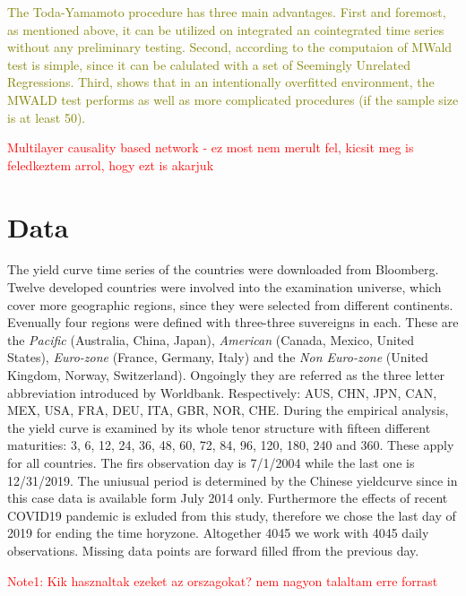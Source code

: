 \documentclass[12pt,bibliography=totoc]{article}
\begin{document}
\textcolor{olive}{The Toda-Yamamoto procedure  has  three main advantages.  First and foremost, as mentioned above, it can be utilized on integrated an cointegrated time series without any preliminary testing. Second, according to \cite{rambaldi1996testing} the computaion of MWald test is simple, since it can be calulated with a set of Seemingly  Unrelated  Regressions. Third, \cite{zapata1997monte} shows that in an intentionally overfitted environment, the MWALD test performs as well as more complicated procedures (if the sample size is at least 50).}


\textcolor{red}{Multilayer causality based network - ez most nem merult fel, kicsit meg is feledkeztem arrol, hogy ezt is akarjuk}


\newpage 



\section{Data}

The yield curve time series of the countries were downloaded from Bloomberg. Twelve developed countries were involved into the examination universe, which cover more geographic regions, since they were selected from different continents. Evenually four regions were defined with three-three suvereigns in each. These are the \textit{Pacific} (Australia, China, Japan), \textit{American} (Canada, Mexico, United States), \textit{Euro-zone} (France, Germany, Italy) and the \textit{Non Euro-zone} (United Kingdom, Norway, Switzerland). Ongoingly they are referred as the three letter abbreviation introduced by Worldbank. Respectively:  AUS, CHN, JPN, CAN, MEX, USA, FRA, DEU, ITA, GBR, NOR, CHE. During the empirical analysis, the yield curve is examined by its whole tenor structure with fifteen different maturities: 3, 6, 12, 24, 36, 48, 60, 72, 84, 96, 120, 180, 240 and 360. These apply for all countries. The firs observation day is 7/1/2004 while the last one is 12/31/2019. The uniusual period is determined by the Chinese yieldcurve since in this case data is available form July 2014 only. Furthermore the effects of recent COVID19 pandemic is exluded from this study, therefore we chose the last day of 2019 for ending the time horyzone. Altogether 4045 we work with 4045 daily observations. Missing data points are forward filled ffrom the previous day.

\textcolor{red}{Note1: Kik hasznaltak ezeket az orszagokat? nem nagyon talaltam erre forrast}
\end{document}
